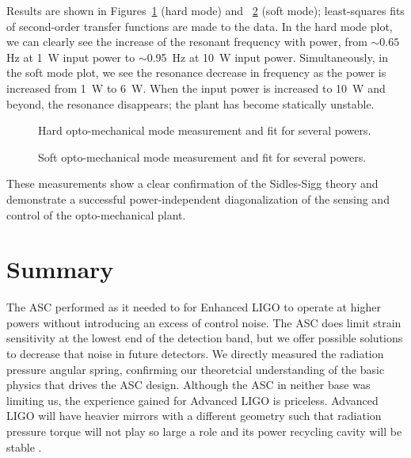 Results are shown in Figures~\ref{fig:hardTF} (hard mode) and
~\ref{fig:softTF} (soft mode); least-squares fits of second-order
transfer functions are made to the data.  In the hard mode plot, we
can clearly see the increase of the resonant frequency with power,
from $\sim0.65$ Hz at 1~W input power to $\sim$0.95~Hz at 10~W input
power.  Simultaneously, in the soft mode plot, we see the resonance
decrease in frequency as the power is increased from 1~W to 6~W.  When
the input power is increased to 10~W and beyond, the resonance
disappears; the plant has become statically unstable.

\begin{figure}
\begin{centering}
\caption{Hard opto-mechanical mode measurement and fit for several
 powers.}
\label{fig:hardTF}
\end{centering}
\end{figure}

\begin{figure}
\begin{centering}
\caption{Soft opto-mechanical mode measurement and fit for several
 powers.}
\label{fig:softTF}
\end{centering}
\end{figure}

These measurements show a clear confirmation of the Sidles-Sigg theory
and demonstrate a successful power-independent diagonalization of the
sensing and control of the opto-mechanical plant.



\section{Summary}
The ASC performed as it needed to for Enhanced LIGO to operate at
higher powers without introducing an excess of control noise. The ASC
does limit strain sensitivity at the lowest end of the detection band,
but we offer possible solutions to decrease that noise in future
detectors. We directly measured the radiation pressure angular spring,
confirming our theoretcial understanding of the basic physics that
drives the ASC design. Although the ASC in neither base was limiting
us, the experience gained for Advanced LIGO is priceless. Advanced
LIGO will have heavier mirrors with a different geometry such that
radiation pressure torque will not play so large a role
\cite{Barsotti2010Alignment} and its power recycling cavity will be
stable \cite{AdvLigoSysDesign}.




